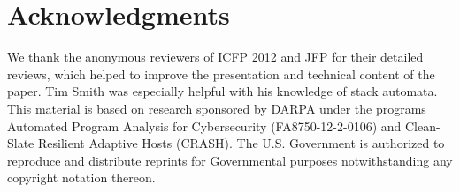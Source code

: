 \section*{Acknowledgments}
We thank the anonymous reviewers of ICFP 2012 and JFP for their
detailed reviews, which helped to improve the presentation and
technical content of the paper.
Tim Smith was especially helpful with his knowledge of stack automata.
This material is based on research sponsored by DARPA under the programs 
Automated Program Analysis for Cybersecurity (FA8750-12-2-0106) and 
Clean-Slate Resilient Adaptive Hosts (CRASH). 
The U.S. Government is authorized to reproduce and
distribute reprints for Governmental purposes notwithstanding any copyright
notation thereon.








